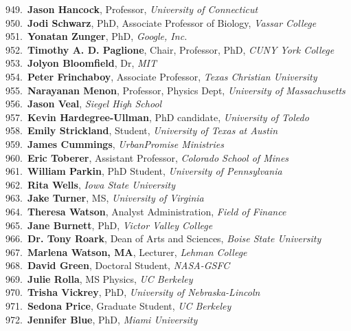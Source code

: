 949.~{\bf Jason Hancock}, Professor, {\sl University of Connecticut} \\
950.~{\bf Jodi Schwarz}, PhD, Associate Professor of Biology, {\sl Vassar College} \\
951.~{\bf Yonatan Zunger}, PhD, {\sl Google, Inc.} \\
952.~{\bf Timothy A. D. Paglione}, Chair, Professor, PhD, {\sl CUNY York College} \\
953.~{\bf Jolyon Bloomfield}, Dr, {\sl MIT} \\
954.~{\bf Peter Frinchaboy}, Associate Professor, {\sl Texas Christian University } \\
955.~{\bf Narayanan Menon}, Professor, Physics Dept, {\sl University of Massachusetts} \\
956.~{\bf Jason Veal}, {\sl Siegel High School} \\
957.~{\bf Kevin Hardegree-Ullman}, PhD candidate, {\sl University of Toledo} \\
958.~{\bf Emily Strickland}, Student, {\sl University of Texas at Austin} \\
959.~{\bf James Cummings}, {\sl UrbanPromise Ministries} \\
960.~{\bf Eric Toberer}, Assistant Professor, {\sl Colorado School of Mines} \\
961.~{\bf William Parkin}, PhD Student, {\sl University of Pennsylvania} \\
962.~{\bf Rita Wells}, {\sl Iowa State University} \\
963.~{\bf Jake Turner}, MS, {\sl University of Virginia} \\
964.~{\bf Theresa Watson}, Analyst Administration, {\sl Field of Finance} \\
965.~{\bf Jane Burnett}, PhD, {\sl Victor Valley College} \\
966.~{\bf Dr. Tony Roark}, Dean of Arts and Sciences, {\sl Boise State University } \\
967.~{\bf Marlena Watson, MA}, Lecturer, {\sl Lehman College} \\
968.~{\bf David Green}, Doctoral Student, {\sl NASA-GSFC} \\
969.~{\bf Julie Rolla}, MS Physics, {\sl UC Berkeley} \\
970.~{\bf Trisha Vickrey}, PhD, {\sl University of Nebraska-Lincoln} \\
971.~{\bf Sedona Price}, Graduate Student, {\sl UC Berkeley} \\
972.~{\bf Jennifer Blue}, PhD, {\sl Miami University} \\
